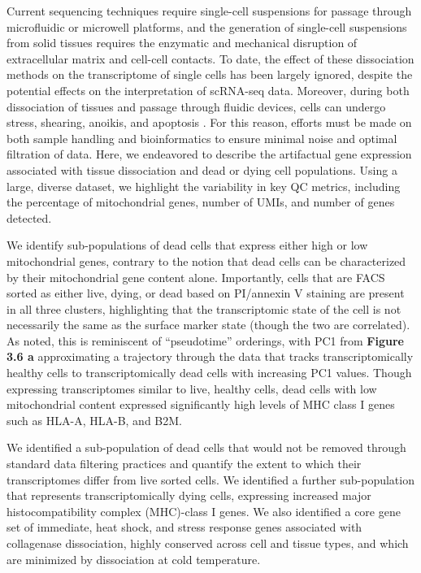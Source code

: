 Current sequencing techniques require single-cell suspensions for passage through microfluidic or microwell platforms, and the generation of single-cell suspensions from solid tissues requires the enzymatic and mechanical disruption of extracellular matrix and cell-cell contacts. To date, the effect of these dissociation methods on the transcriptome of single cells has been largely ignored, despite the potential effects on the interpretation of scRNA-seq data. Moreover, during both dissociation of tissues and passage through fluidic devices, cells can undergo stress, shearing, anoikis, and apoptosis \cite{aljanahi2018introduction}. For this reason, efforts must be made on both sample handling and bioinformatics to ensure minimal noise and optimal filtration of data. Here, we endeavored to describe the artifactual gene expression associated with tissue dissociation and dead or dying cell populations. Using a large, diverse dataset, we highlight the variability in key QC metrics, including the percentage of mitochondrial genes, number of UMIs, and number of genes detected. 

We identify sub-populations of dead cells that express either high or low mitochondrial genes, contrary to the notion that dead cells can be characterized by their mitochondrial gene content alone. Importantly, cells that are FACS sorted as either live, dying, or dead based on PI/annexin V staining are present in all three clusters, highlighting that the transcriptomic state of the cell is not necessarily the same as the surface marker state (though the two are correlated). As noted, this is reminiscent of “pseudotime” orderings, with PC1 from \textbf{Figure 3.6 a} approximating a trajectory through the data that tracks transcriptomically healthy cells to transcriptomically dead cells with increasing PC1 values. Though expressing transcriptomes similar to live, healthy cells, dead cells with low mitochondrial content expressed significantly high levels of MHC class I genes such as HLA-A, HLA-B, and B2M.

 We identified a sub-population of dead cells that would not be removed through standard data filtering practices and quantify the extent to which their transcriptomes differ from live sorted cells. We identified a further sub-population that represents transcriptomically dying cells, expressing increased major histocompatibility complex (MHC)-class I genes. We also identified a core gene set of immediate, heat shock, and stress response genes associated with collagenase dissociation, highly conserved across cell and tissue types, and which are minimized by dissociation at cold temperature.






